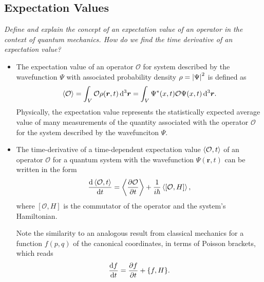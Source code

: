 \documentclass[11pt, a4paper]{article}
\newcommand{\diff}{\mathop{}\!\mathrm{d}} %
\newcommand{\dr}{\diff^{3} \r}  %
\newcommand{\Ham}{Hamiltonian\xspace}
\renewcommand{\vec}[1]{\bm{#1}}  %
\renewcommand{\r}{\vec{r}}  %
\renewcommand{\O}{\mathcal{O}}  %
\renewcommand{\P}{\Psi}  %
\begin{document}
\subsection{Expectation Values}
\textit{Define and explain the concept of an expectation value of an operator in the context of quantum mechanics. How do we find the time derivative of an expectation value? }
\begin{itemize}
    \item The expectation value of an operator $ \O $ for system described by the wavefunction $ \Psi $ with associated probability density $ \rho = \abs{\Psi}^{2} $ is defined as
    \begin{equation*}
       \ev{\O} = \int_{V} \O \rho(\r, t) \dr = \int_{V} \Psi^{*}(x, t)\O \Psi(x,t)\dr.
    \end{equation*}
    Physically, the expectation value represents the statistically expected average value of many measurements of the quantity associated with the operator $ \O $ for the system described by the wavefunciton $ \Psi $. 

    \item The time-derivative of a time-dependent expectation value $ \ev{\O, t} $ of an operator $ \O $ for a quantum system with the wavefunction $ \P(\r, t) $ can be written in the form
    \begin{equation*}
        \dv{\ev{\O, t}}{t} =  \ev{\pdv{\O}{t}} + \frac{1}{i\hbar}\ev{[\O, H]},
    \end{equation*}
    where $ [\O, H] $ is the commutator of the operator and the system's \Ham.

	Note the similarity to an analogous result from classical mechanics for a function $ f(p, q) $ of the canonical coordinates, in terms of Poisson brackets, which reads 
	\begin{equation*}
		\dv{f}{t} = \pdv{f}{t} + \{f, H\}.
	\end{equation*}
\end{itemize}
\end{document}
